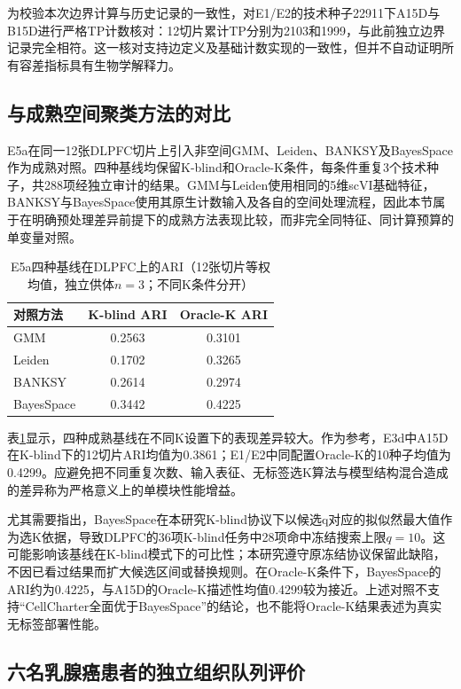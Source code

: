 为校验本次边界计算与历史记录的一致性，对E1/E2的技术种子22911下A15D与B15D进行严格TP计数核对：12切片累计TP分别为2103和1999，与此前独立边界记录完全相符。这一核对支持边定义及基础计数实现的一致性，但并不自动证明所有容差指标具有生物学解释力。

\subsection{与成熟空间聚类方法的对比}
\label{subsec:cellcharter-e5a-v1}

E5a在同一12张DLPFC切片上引入非空间GMM、Leiden、BANKSY及BayesSpace作为成熟对照。四种基线均保留K-blind和Oracle-K条件，每条件重复3个技术种子，共288项经独立审计的结果。GMM与Leiden使用相同的5维scVI基础特征，BANKSY与BayesSpace使用其原生计数输入及各自的空间处理流程，因此本节属于在明确预处理差异前提下的成熟方法表现比较，而非完全同特征、同计算预算的单变量对照。

\begin{table}[htbp]
\centering
\caption{E5a四种基线在DLPFC上的ARI（12张切片等权均值，独立供体$n=3$；不同K条件分开）}
\label{tab:cellcharter-e5a-v1}
\begin{tabular}{lcc}
\toprule
对照方法 & K-blind ARI & Oracle-K ARI\\
\midrule
GMM & 0.2563 & 0.3101\\
Leiden & 0.1702 & 0.3265\\
BANKSY & 0.2614 & 0.2974\\
BayesSpace & 0.3442 & 0.4225\\
\bottomrule
\end{tabular}
\end{table}

表\ref{tab:cellcharter-e5a-v1}显示，四种成熟基线在不同K设置下的表现差异较大。作为参考，E3d中A15D在K-blind下的12切片ARI均值为0.3861；E1/E2中同配置Oracle-K的10种子均值为0.4299。应避免把不同重复次数、输入表征、无标签选K算法与模型结构混合造成的差异称为严格意义上的单模块性能增益。

尤其需要指出，BayesSpace在本研究K-blind协议下以候选q对应的拟似然最大值作为选K依据，导致DLPFC的36项K-blind任务中28项命中冻结搜索上限$q=10$。这可能影响该基线在K-blind模式下的可比性；本研究遵守原冻结协议保留此缺陷，不因已看过结果而扩大候选区间或替换规则。在Oracle-K条件下，BayesSpace的ARI约为0.4225，与A15D的Oracle-K描述性均值0.4299较为接近。上述对照不支持“CellCharter全面优于BayesSpace”的结论，也不能将Oracle-K结果表述为真实无标签部署性能。

\subsection{六名乳腺癌患者的独立组织队列评价}
\label{subsec:cellcharter-e5b-v1}

